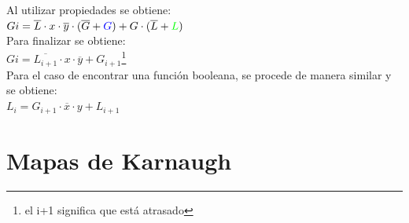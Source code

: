 \documentclass[12pt,letterpaper]{book}
\begin{document}
\begin{multicols}{2}
Al utilizar propiedades se obtiene:\\


$Gi=\overline{L}\cdot x \cdot \overline{y}\cdot (\overline{G} + \textcolor{blue}{G}) + G \cdot( \overline{L}+\textcolor{green}{L})$\\


Para finalizar se obtiene:\\


$Gi=\overline{L_{i+1}}\cdot x \cdot \overline{y} + G_{i+1}$\footnote{el i+1 significa que está atrasado}\\



Para el caso de encontrar una función booleana, se procede de manera similar y se obtiene:\\

$L_i=G_{i+1} \cdot \overline{x} \cdot y+L_{i+1}$

\end{multicols}

\section{Mapas de Karnaugh}
\end{document}
